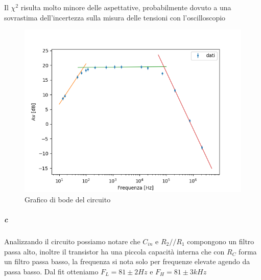\documentclass[10pt,a4paper]{article}
\begin{document}
Il $\chi^2$ risulta molto minore delle aspettative, probabilmente dovuto a una sovrastima dell'incertezza sulla misura delle tensioni con l'oscilloscopio

\begin{figure}
	\centering
    \includegraphics[scale=0.8]{fit.png} 
    \caption{Grafico di bode del circuito}
    \label{fig:fit}
\end{figure}
    
\subparagraph{c}
Analizzando il circuito possiamo notare che $C_{in}$ e $R_2//R_1$ compongono un filtro passa alto, inoltre il transistor ha una piccola capacità interna che con $R_C$ forma un filtro passa basso, la frequenza si nota solo per frequenze elevate agendo da passa basso. Dal fit otteniamo $F_L=81\pm2 Hz$ e $F_H=81\pm3 kHz$
		
\end{document}
